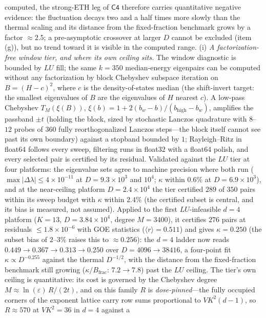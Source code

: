 \begin{remark}
computed, the strong-ETH leg of $\mathsf{C4}$ therefore carries quantitative negative evidence:
the fluctuation decays two and a half times more slowly than the thermal scaling and its
distance from the fixed-fraction benchmark grows by a factor $\approx2.5$; a pre-asymptotic
crossover at larger $D$ cannot be excluded (item (g)), but no trend toward it is visible in
the computed range.
(i) \emph{A factorization-free window tier, and where its own ceiling sits.} The window
diagnostic is bounded by $LU$ fill; the same $k=350$ median-energy eigenpairs can be
computed without any factorization by block Chebyshev subspace iteration on
$B=(H-c)^{2}$, where $c$ is the density-of-states median (the shift-invert target: the
smallest eigenvalues of $B$ are the eigenvalues of $H$ nearest $c$). A low-pass Chebyshev
$T_{M}(\xi(B))$, $\xi(b)=1+2(b_{w}-b)/(b_{\mathrm{high}}-b_{w})$, amplifies the passband
$\pm t$ (holding the block, sized by stochastic Lanczos quadrature with $8$--$12$ probes
of $360$ fully reorthogonalized Lanczos steps---the block itself cannot see past its own
boundary) against a stopband bounded by $1$; Rayleigh--Ritz in float64 follows every
sweep, filtering runs in float32 with a float64 polish, and every selected pair is
certified by its residual. Validated against the $LU$ tier at four platforms: the
eigenvalue sets agree to machine precision where both run ($\max|\Delta\lambda|\leq
4\times10^{-11}$ at $D=9.3\times10^{3}$ and $10^{4}$; $\kappa$ within $0.6\%$ at
$D=6.9\times10^{3}$), and at the near-ceiling platform $D=2.4\times10^{4}$ the tier
certified $289$ of $350$ pairs within its sweep budget with $\kappa$ within $2.4\%$ (the
certified subset is central, and its bias is measured, not assumed). Applied to the first
$LU$-infeasible $d=4$ platform ($K=13$, $D=3.84\times10^{4}$, degree $M=3400$), it
certifies $276$ pairs at residuals $\leq1.8\times10^{-6}$ with GOE statistics
($\langle r\rangle=0.511$) and gives $\kappa=0.250$ (the subset bias of $2$--$3\%$ raises
this to $\approx0.256$): the $d=4$ ladder now reads
$0.449\to0.367\to0.313\to0.250$ over $D=4096\to38416$, a four-point fit
$\kappa\propto D^{-0.255}$ against the thermal $D^{-1/2}$, with the distance from the
fixed-fraction benchmark still growing ($\kappa/B_{\mathrm{frac}}$: $7.2\to7.8$) past
the $LU$ ceiling. The tier's own ceiling is quantitative: its cost is governed by the
Chebyshev degree $M\approx\ln(\varepsilon)\,R/(2t)$, and on this family $R$ is
\emph{dose-pinned}---the fully occupied corners of the exponent lattice carry row sums
proportional to $VK^{2}(d-1)$, so $R\approx570$ at $VK^{2}=36$ in $d=4$ against a

\end{remark}

